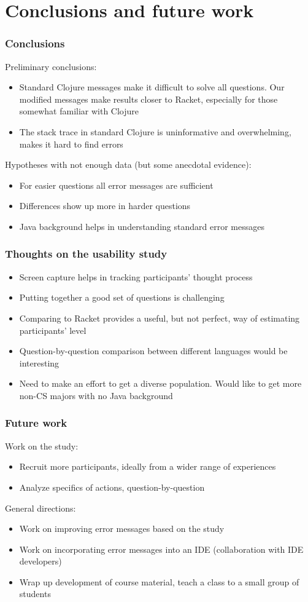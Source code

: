 \documentclass{beamer}
\begin{document}
\section{Conclusions and future work}

\frametitle{Conclusions}

\begin{frame}
Preliminary conclusions:
\begin{itemize}
\item Standard Clojure messages make it difficult to solve all questions. Our modified messages make results closer to Racket, especially for 
those somewhat familiar with Clojure
\item The stack trace in standard Clojure is uninformative and overwhelming, makes it hard to find errors 
\end{itemize}
Hypotheses with not enough data (but some anecdotal evidence):
\begin{itemize}
\item For easier questions all error messages are sufficient
\item Differences show up more in harder questions 
\item Java background helps in understanding standard error messages
\end{itemize}
\end{frame}

\begin{frame}
\frametitle{Thoughts on the usability study}
\begin{itemize}
\item Screen capture helps in tracking participants' thought process
\item Putting together a good set of questions is challenging
\item Comparing to Racket provides a useful, but not perfect, way of estimating participants' level 
\item Question-by-question comparison between different languages would be interesting
\item Need to make an effort to get a diverse population. Would like to get more non-CS majors with no Java background
\end{itemize}
\end{frame}

\begin{frame}
\frametitle{Future work}
Work on the study:
\begin{itemize}
\item Recruit more participants, ideally from a wider range of experiences
\item Analyze specifics of actions, question-by-question
\end{itemize}
General directions:
\begin{itemize}
\item Work on improving error messages based on the study
\item Work on incorporating error messages into an IDE (collaboration with IDE developers)
\item Wrap up development of course material, teach a class to a small group of students 
\end{itemize}
\end{frame}
\end{document}
